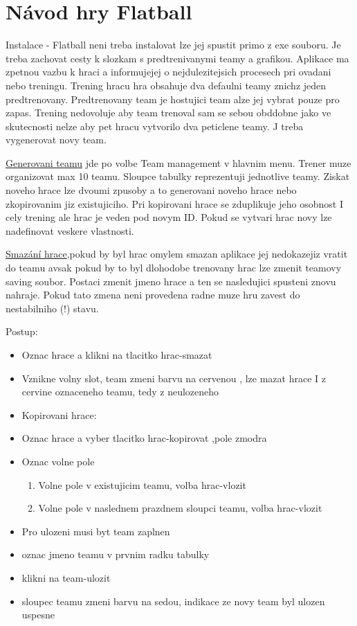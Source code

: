 \documentclass[
  program=ainfk,
  biblatex,
  language=czech,
  figures=true,
  tables ,
  sourcecodes=true,
  glossaries=true,
  index
]{kidiplom}
\begin{document}
 

\section{Návod hry Flatball} 
Instalace - Flatball neni treba instalovat lze jej spustit primo z exe souboru. Je treba zachovat cesty k slozkam s predtrenivanymi teamy a grafikou. 
Aplikace ma zpetnou vazbu k hraci a informujejej o nejdulezitejsich procesech pri ovadani nebo treningu. 
Trening hracu hra obsahuje dva defaulni teamy znichz jeden predtrenovany. Predtrenovany team je hostujici team alze jej vybrat pouze pro zapas. Trening nedovoluje aby team trenoval sam se sebou obddobne jako ve skutecnosti nelze aby pet hracu vytvorilo dva peticlene teamy. J treba vygenerovat novy team.

\underline{Generovani teamu} jde po volbe Team management v hlavnim menu. Trener muze organizovat max 10 teamu. Sloupce tabulky reprezentuji jednotlive teamy. Ziskat noveho hrace lze dvoumi zpusoby a to generovani noveho hrace nebo zkopirovanim jiz existujiciho. Pri kopirovani hrace se zduplikuje jeho osobnost I cely trening ale hrac je veden pod novym ID. Pokud se vytvari hrac novy lze nadefinovat veskere vlastnosti. 

\underline{Smazání hrace},pokud by byl hrac omylem smazan aplikace jej nedokazejiz vratit do teamu avsak pokud by to byl dlohodobe trenovany hrac lze zmenit teamovy saving soubor. Postaci zmenit jmeno hrace a ten se nasledujici spusteni znovu nahraje. Pokud tato zmena neni provedena radne muze hru zavest do nestabilniho (!) stavu.

Postup:
\begin{itemize}
\item  Oznac hrace a klikni na tlacitko hrac-smazat
\item  Vznikne volny slot, team zmeni barvu na cervenou , lze mazat hrace I z cervine oznaceneho teamu, tedy z neulozeneho
\item Kopirovani hrace: 
\item Oznac hrace a vyber tlacitko hrac-kopirovat ,pole zmodra
\item  Oznac volne pole
	\begin{enumerate}
	\item Volne pole v existujicim teamu, volba hrac-vlozit
	\item Volne pole v naslednem prazdnem sloupci teamu, volba hrac-vlozit
	\end{enumerate}
\item  Pro ulozeni musi byt team zaplnen
\item  oznac jmeno teamu v prvnim radku tabulky
\item  klikni na team-ulozit
\item  sloupec teamu zmeni barvu na sedou, indikace ze novy team byl ulozen uspesne
\end{itemize}
\end{document}
